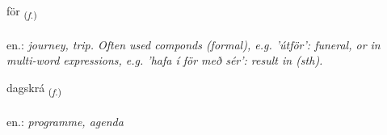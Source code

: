 \documentclass[frontgrid, backgrid]{flacards}\usepackage[]{graphicx}\usepackage[]{xcolor}
\begin{document}
\renewcommand{\flhead}{\vskip5pt \fboxsep=0pt {\small\bfseries\footnotesize Nafnorð | Noun}}
\renewcommand{\fcfoot}{\vskip5pt \fboxsep=0pt \hspace{2pt}{\small\bfseries\footnotesize 2K}}

\renewcommand{\blhead}{\vskip5pt {\small\bfseries\footnotesize Nafnorð | Noun }}
\renewcommand{\bcfoot}{\vskip5pt \hspace{2pt}{\small\bfseries\footnotesize 2K}}


{för \small{\textsubscript{(\textit{f.})}} \\[1ex] %
\textphonetic{[fœːr]} \\
en.: \emph{journey, trip. Often used componds (formal), e.g. 'útför': funeral, or in multi-word expressions, e.g. 'hafa í för með sér': result in (sth).} \\  [2ex]
\renewcommand*{\arraystretch}{0.8}
}

\renewcommand{\flhead}{\vskip5pt \fboxsep=0pt {\small\bfseries\footnotesize Nafnorð | Noun}}
\renewcommand{\fcfoot}{\vskip5pt \fboxsep=0pt \hspace{2pt}{\small\bfseries\footnotesize 2K}}

\renewcommand{\blhead}{\vskip5pt {\small\bfseries\footnotesize Nafnorð | Noun }}
\renewcommand{\bcfoot}{\vskip5pt \hspace{2pt}{\small\bfseries\footnotesize 2K}}


{dagskrá \small{\textsubscript{(\textit{f.})}} \\[1ex] %
\textphonetic{[taxskrau]} \\
en.: \emph{programme, agenda} \\  [2ex]
\renewcommand*{\arraystretch}{0.8}
}
\end{document}
